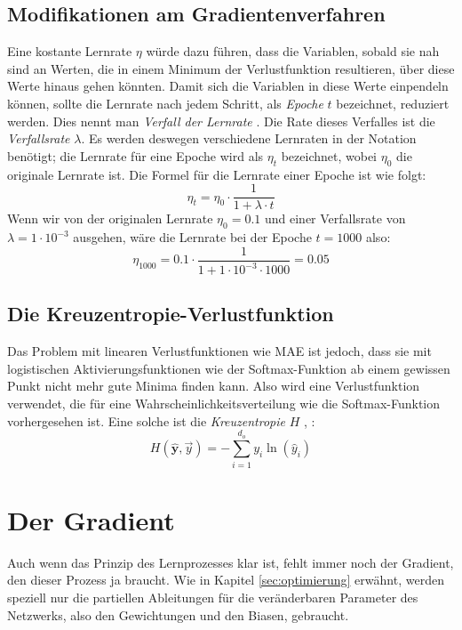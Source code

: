 \documentclass[12pt,titlepage]{article}
\begin{document}
\subsection{Modifikationen am Gradientenverfahren}

Eine kostante Lernrate \(\eta\) würde dazu führen, dass die Variablen, sobald sie nah sind an Werten, die in einem Minimum der Verlustfunktion resultieren, über diese Werte hinaus gehen könnten. Damit sich die Variablen in diese Werte einpendeln können, sollte die Lernrate nach jedem Schritt, als \textit{Epoche} $t$ bezeichnet, reduziert werden. Dies nennt man \textit{Verfall der Lernrate} \autocite{haswaniLearningRateDecay2021}. Die Rate dieses Verfalles ist die \textit{Verfallsrate} $\lambda$. Es werden deswegen verschiedene Lernraten in der Notation benötigt; die Lernrate für eine Epoche wird als \(\eta_t\) bezeichnet, wobei \(\eta_0\) die originale Lernrate ist. Die Formel für die Lernrate einer Epoche ist wie folgt:
\[
  \eta_t = \eta_0 \cdot \frac{1}{1+ \lambda \cdot t}
\]
Wenn wir von der originalen Lernrate \(\eta_0=0.1\) und einer Verfallsrate von \(\lambda = 1 \cdot 10^{-3} \) ausgehen, wäre die Lernrate bei der Epoche $t=1000$ also:
\[
  \eta_{1000} = 0.1 \cdot \frac{1}{1 + 1 \cdot 10^{-3} \cdot 1000} = 0.05
\]

\subsection{Die Kreuzentropie-Verlustfunktion}

Das Problem mit linearen Verlustfunktionen wie MAE ist jedoch, dass sie mit logistischen Aktivierungsfunktionen wie der Softmax-Funktion ab einem gewissen Punkt nicht mehr gute Minima finden kann. Also wird eine Verlustfunktion verwendet, die für eine Wahrscheinlichkeitsverteilung wie die Softmax-Funktion vorhergesehen ist. Eine solche ist die \textit{Kreuzentropie} $H$ \autocite[Kapitel 3]{nielsenNeuralNetworksDeep2015}, \autocite{fortunerMachineLearningGlossary}:
\[
  H(\mathbf{\hat{y}}, \vec{y}) = -\sum_{i=1}^{d_o} y_{i} \ln(\hat{y}_{i})
\]

\section{Der Gradient}

Auch wenn das Prinzip des Lernprozesses klar ist, fehlt immer noch der Gradient, den dieser Prozess ja braucht. Wie in Kapitel \ref{sec:optimierung} erwähnt, werden speziell nur die partiellen Ableitungen für die veränderbaren Parameter des Netzwerks, also den Gewichtungen und den Biasen, gebraucht.
\end{document}

